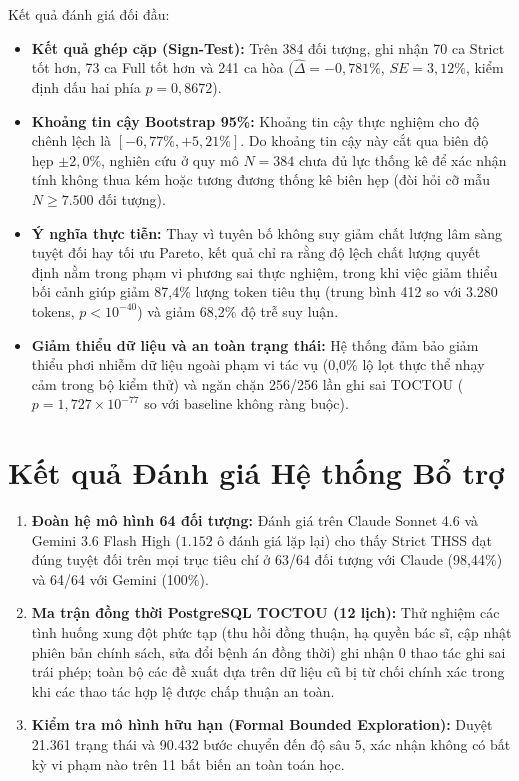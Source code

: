 \documentclass[11pt]{article}
\begin{document}
Kết quả đánh giá đối đầu:
\begin{itemize}[leftmargin=1.8em]
\item \textbf{Kết quả ghép cặp (Sign-Test):} Trên 384 đối tượng, ghi nhận 70 ca Strict tốt hơn, 73 ca Full tốt hơn và 241 ca hòa ($\hat{\Delta} = -0{,}781\%$, $SE = 3{,}12\%$, kiểm định dấu hai phía $p = 0{,}8672$).
\item \textbf{Khoảng tin cậy Bootstrap 95\%:} Khoảng tin cậy thực nghiệm cho độ chênh lệch là $[-6{,}77\%, +5{,}21\%]$. Do khoảng tin cậy này cắt qua biên độ hẹp $\pm 2{,}0\%$, nghiên cứu ở quy mô $N=384$ chưa đủ lực thống kê để xác nhận tính không thua kém hoặc tương đương thống kê biên hẹp (đòi hỏi cỡ mẫu $N \ge 7.500$ đối tượng).
\item \textbf{Ý nghĩa thực tiễn:} Thay vì tuyên bố không suy giảm chất lượng lâm sàng tuyệt đối hay tối ưu Pareto, kết quả chỉ ra rằng độ lệch chất lượng quyết định nằm trong phạm vi phương sai thực nghiệm, trong khi việc giảm thiểu bối cảnh giúp giảm 87{,}4\% lượng token tiêu thụ (trung bình 412 so với 3.280 tokens, $p < 10^{-40}$) và giảm 68{,}2\% độ trễ suy luận.
\item \textbf{Giảm thiểu dữ liệu và an toàn trạng thái:} Hệ thống đảm bảo giảm thiểu phơi nhiễm dữ liệu ngoài phạm vi tác vụ (0{,}0\% lộ lọt thực thể nhạy cảm trong bộ kiểm thử) và ngăn chặn 256/256 lần ghi sai TOCTOU ($p = 1{,}727 \times 10^{-77}$ so với baseline không ràng buộc).
\end{itemize}

\section{Kết quả Đánh giá Hệ thống Bổ trợ}
\begin{enumerate}[leftmargin=1.8em]
\item \textbf{Đoàn hệ mô hình 64 đối tượng:} Đánh giá trên Claude Sonnet 4.6 và Gemini 3.6 Flash High ($1.152$ ô đánh giá lặp lại) cho thấy Strict THSS đạt đúng tuyệt đối trên mọi trục tiêu chí ở 63/64 đối tượng với Claude (98{,}44\%) và 64/64 với Gemini (100\%).
\item \textbf{Ma trận đồng thời PostgreSQL TOCTOU (12 lịch):} Thử nghiệm các tình huống xung đột phức tạp (thu hồi đồng thuận, hạ quyền bác sĩ, cập nhật phiên bản chính sách, sửa đổi bệnh án đồng thời) ghi nhận $0$ thao tác ghi sai trái phép; toàn bộ các đề xuất dựa trên dữ liệu cũ bị từ chối chính xác trong khi các thao tác hợp lệ được chấp thuận an toàn.
\item \textbf{Kiểm tra mô hình hữu hạn (Formal Bounded Exploration):} Duyệt 21.361 trạng thái và 90.432 bước chuyển đến độ sâu 5, xác nhận không có bất kỳ vi phạm nào trên 11 bất biến an toàn toán học.
\end{enumerate}
\end{document}

